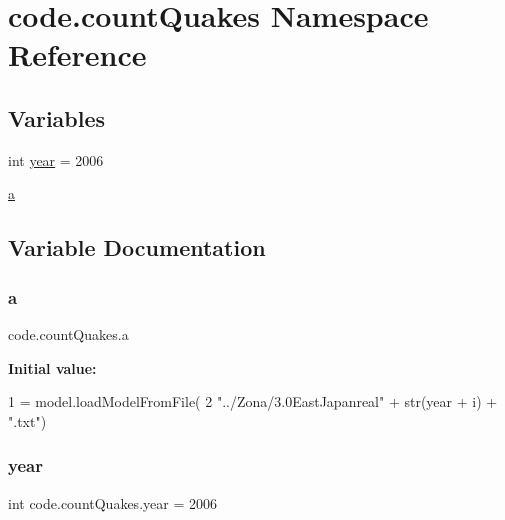 \hypertarget{namespacecode_1_1count_quakes}{}\section{code.\+count\+Quakes Namespace Reference}
\label{namespacecode_1_1count_quakes}
\subsection*{Variables}
\begin{DoxyCompactItemize}
\item 
int \hyperlink{namespacecode_1_1count_quakes_a5926974978a4d0c35a5c1c71b6a88ee6}{year} = 2006
\item 
\hyperlink{namespacecode_1_1count_quakes_a341532017cbd6e61a80736932af44bce}{a}
\end{DoxyCompactItemize}


\subsection{Variable Documentation}
\mbox{\label{namespacecode_1_1count_quakes_a341532017cbd6e61a80736932af44bce}} 
\subsubsection{\texorpdfstring{a}{a}}
{\footnotesize\ttfamily code.\+count\+Quakes.\+a}

{\bfseries Initial value\+:}
\begin{DoxyCode}
1 =  model.loadModelFromFile(
2         \textcolor{stringliteral}{"../Zona/3.0EastJapanreal"} + str(year + i) + \textcolor{stringliteral}{".txt"})
\end{DoxyCode}
\mbox{\label{namespacecode_1_1count_quakes_a5926974978a4d0c35a5c1c71b6a88ee6}} 
\subsubsection{\texorpdfstring{year}{year}}
{\footnotesize\ttfamily int code.\+count\+Quakes.\+year = 2006}

